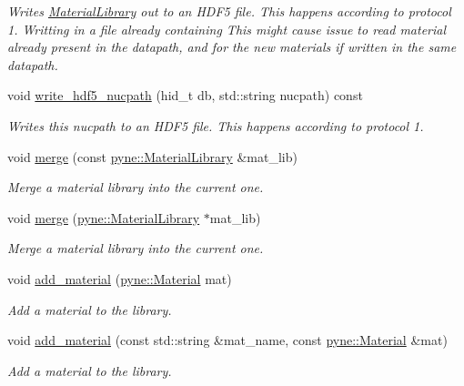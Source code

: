 \begin{DoxyCompactItemize}
\begin{DoxyCompactList}\small\item\em Writes \hyperlink{classpyne_1_1_material_library}{Material\+Library} out to an H\+D\+F5 file. This happens according to protocol 1. Writting in a file already containing This might cause issue to read material already present in the datapath, and for the new materials if written in the same datapath. \end{DoxyCompactList}\item 
void \hyperlink{classpyne_1_1_material_library_afceefe2623ad725faa0c6a256b66a0dc}{write\+\_\+hdf5\+\_\+nucpath} (hid\+\_\+t db, std\+::string nucpath) const
\begin{DoxyCompactList}\small\item\em Writes this nucpath to an H\+D\+F5 file. This happens according to protocol 1. \end{DoxyCompactList}\item 
void \hyperlink{classpyne_1_1_material_library_a9185526712a0bc540c9ca43b1fc02dd4}{merge} (const \hyperlink{classpyne_1_1_material_library}{pyne\+::\+Material\+Library} \&mat\+\_\+lib)
\begin{DoxyCompactList}\small\item\em Merge a material library into the current one. \end{DoxyCompactList}\item 
void \hyperlink{classpyne_1_1_material_library_afce914be857b938191b0322615bbd8f4}{merge} (\hyperlink{classpyne_1_1_material_library}{pyne\+::\+Material\+Library} $\ast$mat\+\_\+lib)
\begin{DoxyCompactList}\small\item\em Merge a material library into the current one. \end{DoxyCompactList}\item 
void \hyperlink{classpyne_1_1_material_library_a720dba099f6e634c234fc9d261e89e2d}{add\+\_\+material} (\hyperlink{classpyne_1_1_material}{pyne\+::\+Material} mat)
\begin{DoxyCompactList}\small\item\em Add a material to the library. \end{DoxyCompactList}\item 
void \hyperlink{classpyne_1_1_material_library_a4231a77add5e603588b3fe62531fe2dd}{add\+\_\+material} (const std\+::string \&mat\+\_\+name, const \hyperlink{classpyne_1_1_material}{pyne\+::\+Material} \&mat)
\begin{DoxyCompactList}\small\item\em Add a material to the library. \end{DoxyCompactList}\item 

\end{DoxyCompactItemize}
